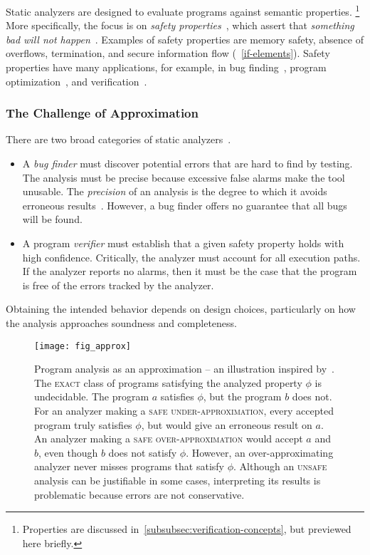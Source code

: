Static analyzers are designed to evaluate programs against semantic properties.%
\footnote{Properties are discussed in~\autoref{subsubsec:verification-concepts},
but previewed here briefly.} More specifically, the focus is on \emph{safety
properties}~\cite[p. 6]{moller2023}, which assert that \emph{something bad will
not happen}~\cite{lamport1977}. Examples of safety properties are memory safety,
absence of overflows, termination, and secure information flow
(\cf~\autoref{if-elements}). Safety properties have many applications, for
example, in bug finding~\cite{popeea2010}, program
optimization~\cite{rinard1996}, and verification~\cite{falcone2009}.

\subsubsection{The Challenge of Approximation}\label{static-approx}

There are two broad categories of static analyzers~\cite{jourdan2015}.

\begin{itemize}

\item A \emph{bug finder} must discover potential errors that are hard to find by testing.
The analysis must be precise because excessive false alarms make the tool unusable.
The \emph{precision} of an analysis is the degree to which it avoids erroneous results~\cite{livshits2015}.
However, a bug finder offers no guarantee that all bugs will be found.

\item A program \emph{verifier} must establish that a given safety property holds with high confidence.
Critically, the analyzer must account for all execution paths.
If the analyzer reports no alarms, then it must be the case that the program is free of the errors tracked by the analyzer.

\end{itemize}

Obtaining the intended behavior depends on design choices, particularly on how the analysis approaches soundness and completeness.

\begin{figure}[t]
\centering
\texttt{[image: fig\_approx]}
\caption[Program analysis as an approximation]{
Program analysis as an approximation -- an illustration inspired by~\textcite{steffen2020}.
The \textsc{exact} class of programs satisfying the analyzed property \(\phi\) is undecidable.
The program \(a\) satisfies \(\phi\), but the program \(b\) does not.
For an analyzer making a \textsc{safe under-approximation}, every accepted program truly satisfies \(\phi\), but would give an erroneous result on \(a\).
An analyzer making a \textsc{safe over-approximation} would accept \(a\) and \(b\), even though \(b\) does not satisfy \(\phi\).
However, an over-approximating analyzer never misses programs that satisfy \(\phi\).
Although an \textsc{unsafe} analysis can be justifiable in some cases,
interpreting its results is problematic because errors are not conservative.
}\label{fig:approx}
\end{figure}

